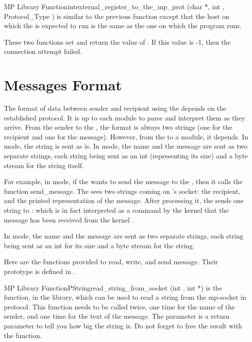 \begin{typefn}{MP Library Function}{int}{external\_register\_to\_the\_mp\_prot}
        {(char *,  int , Protocol\_Type )}
is similar to the previous function except that the host on which the
\MP{} is expected to run is the same as the one on which the
program runs.
\end{typefn}

These two functions set and return the value of . If this value
is -1, then the connection attempt failed.

\section{Messages Format}

The format of data between sender and recipient using the \MP{} depends on the
established protocol. It is up to each module to parse and interpret them as
they arrive. From the sender to the \MP{}, the format is always two strings
(one for the recipient and one for the message). However, from the \MP{} to a
module, it depends. In  mode, the string  is sent as is. In  mode, the name and
the message are sent as two separate strings, each string being sent as an int
(representing its size) and a byte stream for the string itself.

For example, in  mode, if the \CPK{}  wants to send
the message  to the \CPK{} , then it
calls the function send\_message. The \MP{} sees two strings coming on
's socket: \*  the recipient, and  the printed representation of the message. After processing it, the
\MP{} sends one string to : \*  which is in fact interpreted as a command by the  kernel
that the message  has been received from the
kernel .

In  mode, the name and the message are sent as two separate
strings, each string being sent as an int for its size and a byte stream for
the string.

Here are the functions provided to read, write, and send message. Their
prototype is defined in .

\begin{typefn}{MP Library Function}{PString}{read\_string\_from\_socket}
        {(int , int *)}
is the function, in the  library, which can be used to read a
string from the mp-socket in  protocol. This function needs to be
called twice, one time for the name of the sender, and one time for the text of
the message. The  parameter is a return parameter to tell you how big
the string is.  Do not forget to free the result with the  function.
\end{typefn}

